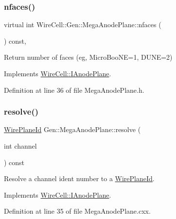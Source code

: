 \subsubsection{\texorpdfstring{nfaces()}{nfaces()}}
{\footnotesize\ttfamily virtual int Wire\+Cell\+::\+Gen\+::\+Mega\+Anode\+Plane\+::nfaces (\begin{DoxyParamCaption}{ }\end{DoxyParamCaption}) const\hspace{0.3cm}{\ttfamily [inline]}, {\ttfamily [virtual]}}



Return number of faces (eg, Micro\+Boo\+NE=1, D\+U\+NE=2) 



Implements \hyperlink{class_wire_cell_1_1_i_anode_plane_ace24697d669e5b25613db8ad110611f0}{Wire\+Cell\+::\+I\+Anode\+Plane}.



Definition at line 36 of file Mega\+Anode\+Plane.\+h.

\mbox{\label{class_wire_cell_1_1_gen_1_1_mega_anode_plane_a39f210db553e1e981412c2c44861870c}} 
\subsubsection{\texorpdfstring{resolve()}{resolve()}}
{\footnotesize\ttfamily \hyperlink{class_wire_cell_1_1_wire_plane_id}{Wire\+Plane\+Id} Gen\+::\+Mega\+Anode\+Plane\+::resolve (\begin{DoxyParamCaption}\item[{int}]{channel }\end{DoxyParamCaption}) const\hspace{0.3cm}{\ttfamily [virtual]}}



Resolve a channel ident number to a \hyperlink{class_wire_cell_1_1_wire_plane_id}{Wire\+Plane\+Id}. 



Implements \hyperlink{class_wire_cell_1_1_i_anode_plane_a566ba20aec7e85b99a9f4304f073afa0}{Wire\+Cell\+::\+I\+Anode\+Plane}.



Definition at line 35 of file Mega\+Anode\+Plane.\+cxx.

